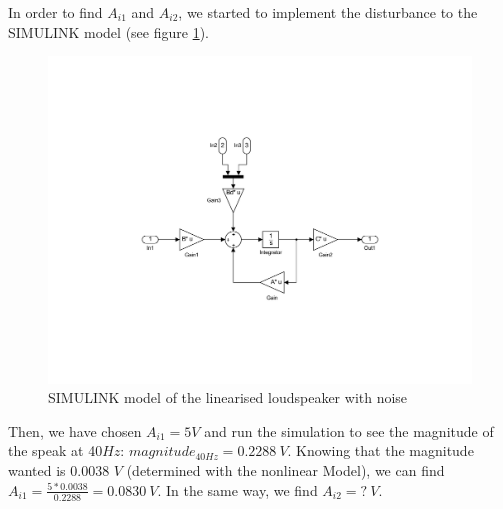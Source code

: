 In order to find $A_{i1}$ and $A_{i2}$, we started to implement the disturbance to the SIMULINK model (see figure \ref{fig:linearModelNoise}).

\begin{figure}[H]
 \centering 
 \includegraphics[trim=5cm 5cm 2cm 5cm, clip=true, totalheight=0.35\textheight, angle=0]{figures/linearModelNoise.pdf}
 \caption{SIMULINK model of the linearised loudspeaker with noise}
\label{fig:linearModelNoise}
\end{figure}

Then, we have chosen $A_{i1}=5V$ and run the simulation to see the magnitude of the speak at 40$Hz$: $magnitude_{40Hz} = 0.2288\ V$. Knowing that the magnitude wanted is 0.0038 $V$ (determined with the nonlinear Model), we can find $A_{i1}=\frac{5*0.0038}{0.2288}=0.0830\ V$. In the same way, we find $A_{i2}=?\ V$.